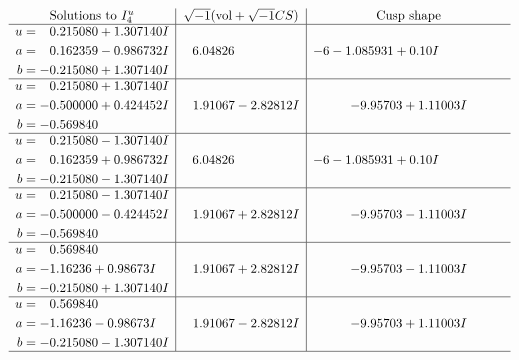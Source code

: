 \documentclass[1p]{elsarticle_modified}
\theoremstyle{definition}
\newcommand{\I}{\sqrt{-1}}
\begin{document}
$$\begin{array}{c|c|c}  
\text{Solutions to }I^u_{4}& \I (\text{vol} + \sqrt{-1}CS) & \text{Cusp shape}\\
 \hline 
\begin{aligned}
u &= \phantom{-}0.215080 + 1.307140 I \\
a &= \phantom{-}0.162359 - 0.986732 I \\
b &= -0.215080 + 1.307140 I\end{aligned}
 & \phantom{-}6.04826\phantom{ +0.000000I} &                  -6
-1.085931 + 0. 10   I\phantom{ +0.000000I} \\ \hline\begin{aligned}
u &= \phantom{-}0.215080 + 1.307140 I \\
a &= -0.500000 + 0.424452 I \\
b &= -0.569840\phantom{ +0.000000I}\end{aligned}
 & \phantom{-}1.91067 - 2.82812 I & -9.95703 + 1.11003 I \\ \hline\begin{aligned}
u &= \phantom{-}0.215080 - 1.307140 I \\
a &= \phantom{-}0.162359 + 0.986732 I \\
b &= -0.215080 - 1.307140 I\end{aligned}
 & \phantom{-}6.04826\phantom{ +0.000000I} &                  -6
-1.085931 + 0. 10   I\phantom{ +0.000000I} \\ \hline\begin{aligned}
u &= \phantom{-}0.215080 - 1.307140 I \\
a &= -0.500000 - 0.424452 I \\
b &= -0.569840\phantom{ +0.000000I}\end{aligned}
 & \phantom{-}1.91067 + 2.82812 I & -9.95703 - 1.11003 I \\ \hline\begin{aligned}
u &= \phantom{-}0.569840\phantom{ +0.000000I} \\
a &= -1.16236 + 0.98673 I \\
b &= -0.215080 + 1.307140 I\end{aligned}
 & \phantom{-}1.91067 + 2.82812 I & -9.95703 - 1.11003 I \\ \hline\begin{aligned}
u &= \phantom{-}0.569840\phantom{ +0.000000I} \\
a &= -1.16236 - 0.98673 I \\
b &= -0.215080 - 1.307140 I\end{aligned}
 & \phantom{-}1.91067 - 2.82812 I & -9.95703 + 1.11003 I\\
 \hline 
 \end{array}$$\newpage
\end{document}
